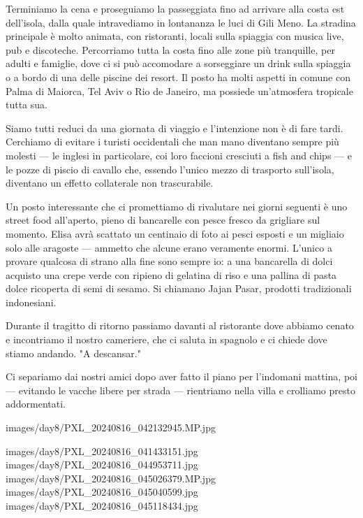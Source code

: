 Terminiamo la cena e proseguiamo la passeggiata fino ad arrivare alla costa est dell'isola, dalla quale intravediamo in lontananza le luci di Gili Meno. La stradina principale è molto animata, con ristoranti, locali sulla spiaggia con musica live, pub e discoteche. Percorriamo tutta la costa fino alle zone più tranquille, per adulti e famiglie, dove ci si può accomodare a sorseggiare un drink sulla spiaggia o a bordo di una delle piscine dei resort. Il posto ha molti aspetti in comune con Palma di Maiorca, Tel Aviv o Rio de Janeiro, ma possiede un'atmosfera tropicale tutta sua.

Siamo tutti reduci da una giornata di viaggio e l'intenzione non è di fare tardi. Cerchiamo di evitare i turisti occidentali che man mano diventano sempre più molesti — le inglesi in particolare, coi loro faccioni cresciuti a fish and chips — e le pozze di piscio di cavallo che, essendo l'unico mezzo di trasporto sull'isola, diventano un effetto collaterale non trascurabile.

Un posto interessante che ci promettiamo di rivalutare nei giorni seguenti è uno street food all'aperto, pieno di bancarelle con pesce fresco da grigliare sul momento. Elisa avrà scattato un centinaio di foto ai pesci esposti e un migliaio solo alle aragoste — ammetto che alcune erano veramente enormi. L'unico a provare qualcosa di strano alla fine sono sempre io: a una bancarella di dolci acquisto una crepe verde con ripieno di gelatina di riso e una pallina di pasta dolce ricoperta di semi di sesamo. Si chiamano Jajan Pasar, prodotti tradizionali indonesiani.

Durante il tragitto di ritorno passiamo davanti al ristorante dove abbiamo cenato e incontriamo il nostro cameriere, che ci saluta in spagnolo e ci chiede dove stiamo andando. "A descansar."

Ci separiamo dai nostri amici dopo aver fatto il piano per l'indomani mattina, poi — evitando le vacche libere per strada — rientriamo nella villa e crolliamo presto addormentati.

\pagestyle{empty} %


                      {images/day8/PXL_20240816_042132945.MP.jpg}

                   {images/day8/PXL_20240816_041433151.jpg}
                   {images/day8/PXL_20240816_044953711.jpg}
                   {images/day8/PXL_20240816_045026379.MP.jpg}
                   {images/day8/PXL_20240816_045040599.jpg}
                   {images/day8/PXL_20240816_045118434.jpg}

